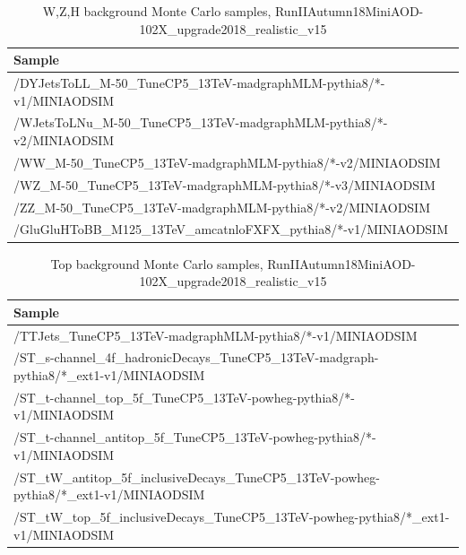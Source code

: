 \begin{table}[htb]
  \caption{W,Z,H background Monte Carlo samples, RunIIAutumn18MiniAOD-102X\_upgrade2018\_realistic\_v15}
  \begin{center}
    \footnotesize
    \begin{tabular}{l}\hline
      Sample \\
      \hline
      /DYJetsToLL\_M-50\_TuneCP5\_13TeV-madgraphMLM-pythia8/*-v1/MINIAODSIM \\
      \hline
      /WJetsToLNu\_M-50\_TuneCP5\_13TeV-madgraphMLM-pythia8/*-v2/MINIAODSIM \\
      \hline
      /WW\_M-50\_TuneCP5\_13TeV-madgraphMLM-pythia8/*-v2/MINIAODSIM \\
      /WZ\_M-50\_TuneCP5\_13TeV-madgraphMLM-pythia8/*-v3/MINIAODSIM \\
      /ZZ\_M-50\_TuneCP5\_13TeV-madgraphMLM-pythia8/*-v2/MINIAODSIM \\
      \hline
      /GluGluHToBB\_M125\_13TeV\_amcatnloFXFX\_pythia8/*-v1/MINIAODSIM \\
      \hline
    \end{tabular}
    \label{tab:wzsample}
  \end{center}
\end{table}


\begin{table}[htb]
  \caption{Top background Monte Carlo samples, RunIIAutumn18MiniAOD-102X\_upgrade2018\_realistic\_v15}
  \begin{center}
    \footnotesize
    \begin{tabular}{l}\hline
      Sample \\
      \hline
      /TTJets\_TuneCP5\_13TeV-madgraphMLM-pythia8/*-v1/MINIAODSIM \\
      \hline
      /ST\_s-channel\_4f\_hadronicDecays\_TuneCP5\_13TeV-madgraph-pythia8/*\_ext1-v1/MINIAODSIM \\
      /ST\_t-channel\_top\_5f\_TuneCP5\_13TeV-powheg-pythia8/*-v1/MINIAODSIM \\
      /ST\_t-channel\_antitop\_5f\_TuneCP5\_13TeV-powheg-pythia8/*-v1/MINIAODSIM \\
      /ST\_tW\_antitop\_5f\_inclusiveDecays\_TuneCP5\_13TeV-powheg-pythia8/*\_ext1-v1/MINIAODSIM \\
      /ST\_tW\_top\_5f\_inclusiveDecays\_TuneCP5\_13TeV-powheg-pythia8/*\_ext1-v1/MINIAODSIM \\
      \hline
    \end{tabular}
    \label{tab:topsample}
  \end{center}
\end{table}


